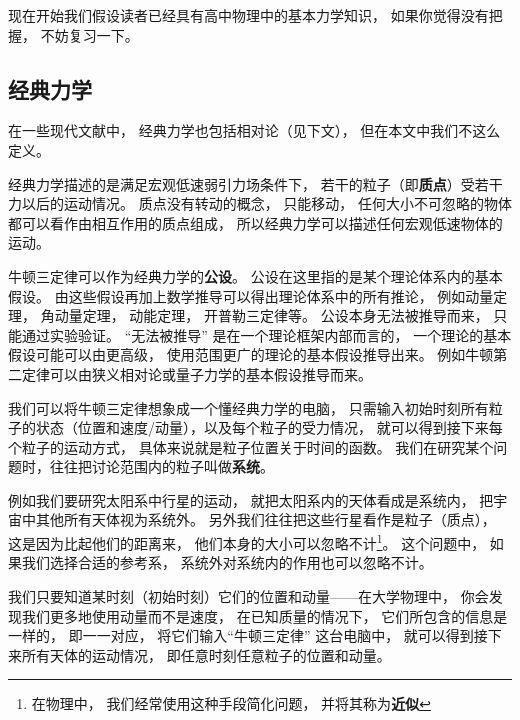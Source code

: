 
\begin{issues}
\issueTODO
\end{issues}


现在开始我们假设读者已经具有高中物理中的基本力学知识， 如果你觉得没有把握， 不妨复习一下。

\subsection{经典力学}
在一些现代文献中， 经典力学也包括相对论（见下文）， 但在本文中我们不这么定义。

经典力学描述的是满足宏观低速弱引力场条件下， 若干的粒子（即\textbf{质点}）受若干力以后的运动情况。  质点没有转动的概念， 只能移动， 任何大小不可忽略的物体都可以看作由相互作用的质点组成， 所以经典力学可以描述任何宏观低速物体的运动。

牛顿三定律可以作为经典力学的\textbf{公设}。 公设在这里指的是某个理论体系内的基本假设。 由这些假设再加上数学推导可以得出理论体系中的所有推论， 例如动量定理， 角动量定理， 动能定理， 开普勒三定律等。 公设本身无法被推导而来， 只能通过实验验证。 “无法被推导” 是在一个理论框架内部而言的， 一个理论的基本假设可能可以由更高级， 使用范围更广的理论的基本假设推导出来。 例如牛顿第二定律可以由狭义相对论或量子力学的基本假设推导而来。

我们可以将牛顿三定律想象成一个懂经典力学的电脑， 只需输入初始时刻所有粒子的状态（位置和速度/动量），以及每个粒子的受力情况， 就可以得到接下来每个粒子的运动方式， 具体来说就是粒子位置关于时间的函数。 我们在研究某个问题时，往往把讨论范围内的粒子叫做\textbf{系统}。

例如我们要研究太阳系中行星的运动， 就把太阳系内的天体看成是系统内， 把宇宙中其他所有天体视为系统外。 另外我们往往把这些行星看作是粒子（质点）， 这是因为比起他们的距离来， 他们本身的大小可以忽略不计\footnote{在物理中， 我们经常使用这种手段简化问题， 并将其称为\textbf{近似}}。 这个问题中， 如果我们选择合适的参考系， 系统外对系统内的作用也可以忽略不计。

我们只要知道某时刻（初始时刻）它们的位置和动量——在大学物理中， 你会发现我们更多地使用动量而不是速度， 在已知质量的情况下， 它们所包含的信息是一样的， 即一一对应， 将它们输入“牛顿三定律” 这台电脑中， 就可以得到接下来所有天体的运动情况， 即任意时刻任意粒子的位置和动量。


